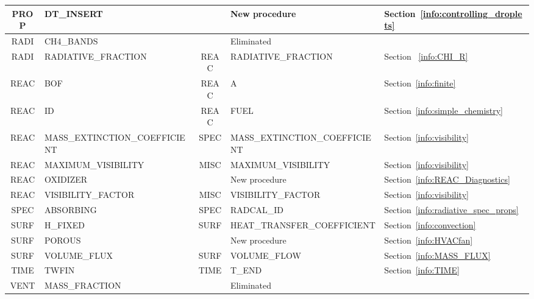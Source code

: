 \documentclass[11pt]{book}
\begin{document}
\begin{table}
\begin{tabular}{@{\extracolsep{\fill}}|c|l|c|l|l|}
{\ct PROP}    & {\ct DT\_INSERT}                    &              & New procedure                               & Section~\ref{info:controlling_droplets} \\ \hline
{\ct RADI}    & {\ct CH4\_BANDS}                    &              & Eliminated                                  &                                         \\ \hline
{\ct RADI}    & {\ct RADIATIVE\_FRACTION}           &  {\ct REAC}  & {\ct RADIATIVE\_FRACTION}                   & Section ~\ref{info:CHI_R}               \\ \hline
{\ct REAC}    & {\ct BOF}                           &  {\ct REAC}  & {\ct A}                                     & Section~\ref{info:finite}               \\ \hline
{\ct REAC}    & {\ct ID}                            &  {\ct REAC}  & {\ct FUEL}                                  & Section~\ref{info:simple_chemistry}     \\ \hline
{\ct REAC}    & {\ct MASS\_EXTINCTION\_COEFFICIENT} &  {\ct SPEC}  & {\ct MASS\_EXTINCTION\_COEFFICIENT}         & Section~\ref{info:visibility}           \\ \hline
{\ct REAC}    & {\ct MAXIMUM\_VISIBILITY}           &  {\ct MISC}  & {\ct MAXIMUM\_VISIBILITY}                   & Section~\ref{info:visibility}           \\ \hline
{\ct REAC}    & {\ct OXIDIZER}                      &              & New procedure                               & Section~\ref{info:REAC_Diagnostics}     \\ \hline
{\ct REAC}    & {\ct VISIBILITY\_FACTOR}            &  {\ct MISC}  & {\ct VISIBILITY\_FACTOR}                    & Section~\ref{info:visibility}           \\ \hline
{\ct SPEC}    & {\ct ABSORBING}                     &  {\ct SPEC}  & {\ct RADCAL\_ID }                           & Section~\ref{info:radiative_spec_props} \\ \hline
{\ct SURF}    & {\ct H\_FIXED}                      &  {\ct SURF}  & {\ct HEAT\_TRANSFER\_COEFFICIENT}           & Section~\ref{info:convection}           \\ \hline
{\ct SURF}    & {\ct POROUS}                        &              & New procedure                               & Section~\ref{info:HVACfan}              \\ \hline
{\ct SURF}    & {\ct VOLUME\_FLUX}                  &  {\ct SURF}  & {\ct VOLUME\_FLOW}                          & Section~\ref{info:MASS_FLUX}            \\ \hline
{\ct TIME}    & {\ct TWFIN}                         &  {\ct TIME}  & {\ct T\_END}                                & Section~\ref{info:TIME}                 \\ \hline
{\ct VENT}    & {\ct MASS\_FRACTION}                &              & Eliminated                                  &                                         \\ \hline
\end{tabular}
\end{table}
\end{document}
